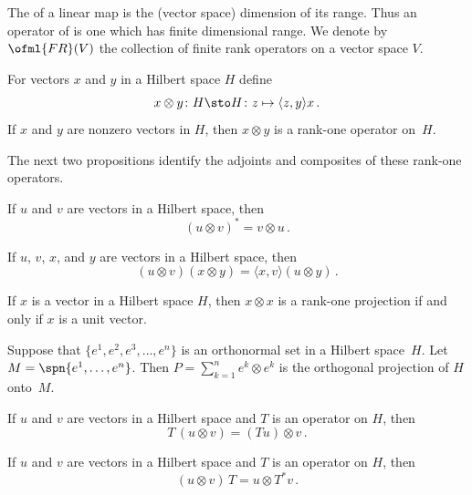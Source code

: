\begin{defn} The
 of a linear map is the (vector space) dimension of its range.  Thus an operator of
 is one which has finite dimensional range. We denote by $\ofml{FR}(V)$
the collection of finite rank operators on a vector space $V$.
\end{defn}

\begin{exam}\label{0022431fa} For vectors $x$ and $y$ in a Hilbert space $H$ define
   \[ x \otimes y\colon H \sto H \colon z \mapsto \langle z,y \rangle x\,. \]
If $x$ and $y$ are nonzero vectors in $H$, then $x \otimes y$ is a rank-one operator on~$H$.
\end{exam}

The next two propositions identify the adjoints and composites of these rank-one operators.

\begin{prop} If $u$ and $v$ are vectors in a Hilbert space, then
   \[ (u \otimes v)^* = v \otimes u\,. \]
\end{prop}

\begin{prop} If $u$, $v$, $x$, and $y$ are vectors in a Hilbert space, then
    \[ (u \otimes v)(x \otimes y) = \langle x,v \rangle (u \otimes y)\,. \]
\end{prop}

\begin{prop} If $x$ is a vector in a Hilbert space $H$, then $x \otimes x$ is a rank-one projection if and
only if $x$ is a unit vector.
\end{prop}

\begin{prop} Suppose that $\{e^1, e^2, e^3, \dots, e^n\}$ is an orthonormal set in a Hilbert space~$H$.  Let
$M = \spn\{e^1, \dots, e^n\}$.  Then $P = \sum_{k=1}^n e^k \otimes e^k$ is the orthogonal projection of $H$ onto~$M$.
\end{prop}

\begin{prop}\label{prop_op_act_otimes1} If $u$ and $v$ are vectors in a Hilbert space and $T$ is an operator on $H$, then
   \[ T\,(u \otimes v) = (Tu) \otimes v\,. \]
\end{prop}

\begin{prop}\label{prop_op_act_otimes2} If $u$ and $v$ are vectors in a Hilbert space and $T$ is an operator on $H$, then
   \[ (u \otimes v)\,T = u \otimes T^*v\,. \]
\end{prop}

